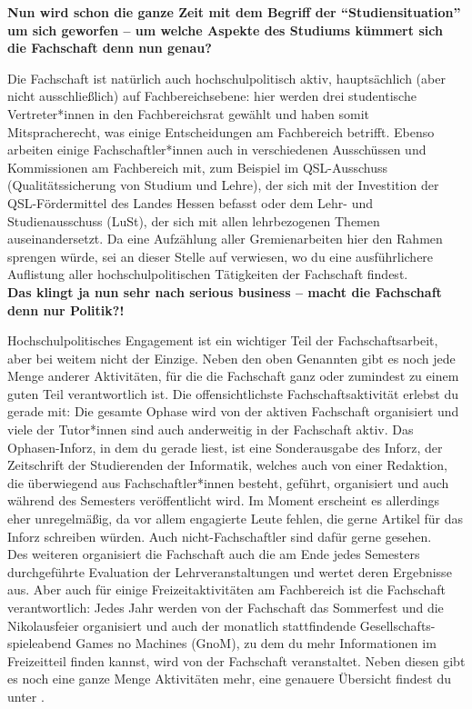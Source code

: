 {    \textbf{Nun wird schon die ganze Zeit mit dem Begriff der "`Studiensituation"' um sich geworfen – um welche Aspekte des Studiums kümmert sich die Fachschaft denn nun genau?}

    Die Fachschaft ist natürlich auch hochschulpolitisch aktiv, hauptsächlich (aber nicht ausschließlich) auf Fachbereichsebene: hier werden drei studentische Vertreter*innen in den Fachbereichsrat gewählt und haben somit Mitspracherecht, was einige Entscheidungen am Fachbereich betrifft. Ebenso arbeiten einige Fachschaftler*innen auch in verschiedenen Ausschüssen und Kommissionen am Fachbereich mit, zum Beispiel im QSL-Ausschuss (Qualitätssicherung von Studium und Lehre), der sich mit der Investition der QSL-Fördermittel des Landes Hessen befasst oder dem Lehr- und Studienausschuss (LuSt), der sich mit allen lehrbezogenen Themen auseinandersetzt. Da eine Aufzählung aller Gremienarbeiten hier den Rahmen sprengen würde, sei an dieser Stelle auf \footnotemark[1] verwiesen, wo du eine ausführlichere Auflistung aller hochschulpolitischen Tätigkeiten der Fachschaft findest.\\

    \textbf{Das klingt ja nun sehr nach serious business – macht die Fachschaft denn nur Politik?!}

    Hochschulpolitisches Engagement ist ein wichtiger Teil der Fachschaftsarbeit, aber bei weitem nicht der Einzige. Neben den oben Genannten gibt es noch jede Menge anderer Aktivitäten, für die die Fachschaft ganz oder zumindest zu einem guten Teil verantwortlich ist. Die offensichtlichste Fachschaftsaktivität erlebst du gerade mit: Die gesamte Ophase wird von der aktiven Fachschaft organisiert und viele der Tutor*innen sind auch anderweitig in der Fachschaft aktiv. Das Ophasen-Inforz, in dem du gerade liest, ist eine Sonderausgabe des Inforz, der Zeitschrift der Studierenden der Informatik, welches auch von einer Redaktion, die überwiegend aus Fachschaftler*innen besteht, geführt, organisiert und auch während des Semesters veröffentlicht wird. Im Moment erscheint es allerdings eher unregelmäßig, da vor allem engagierte Leute fehlen, die gerne Artikel für das Inforz schreiben würden. Auch nicht-Fachschaftler sind dafür gerne gesehen.\\
    Des weiteren organisiert die Fachschaft auch die am Ende jedes Semesters durchgeführte Evaluation der Lehrveranstaltungen und wertet deren Ergebnisse aus. Aber auch für einige Freizeitaktivitäten am Fachbereich ist die Fachschaft verantwortlich: Jedes Jahr werden von der Fachschaft das Sommerfest und die Nikolausfeier organisiert und auch der monatlich stattfindende Gesellschafts-spieleabend Games no Machines (GnoM), zu dem du mehr Informationen im Freizeitteil finden kannst, wird von der Fachschaft veranstaltet. Neben diesen gibt es noch eine ganze Menge Aktivitäten mehr, eine genauere Übersicht findest du unter \footnotemark[2].\\

}
